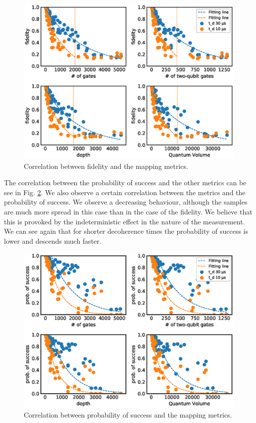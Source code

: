 \begin{figure}[htbp]
\centering
\includegraphics[width=\textwidth]{figures/f_metrics_correlation_poly.eps}
\caption{\label{fig:f_metrics_correlation}
Correlation between fidelity and the mapping metrics.}
\end{figure}

The correlation between the probability of success and the other metrics can be see in Fig. \ref{fig:ps_metrics_correlation}.
We also observe a certain correlation between the metrics and the probability of success.
We observe a decreasing behaviour, although the samples are much more spread in this case than in the case of the fidelity. We believe that this is provoked by the indeterministic effect in the nature of the measurement.
We can see again that for shorter decoherence times the probability of success is lower and descends much faster. 


\begin{figure}[htbp]
\centering
\includegraphics[width=\textwidth]{figures/ps_metrics_correlation.eps}
\caption{\label{fig:ps_metrics_correlation}
Correlation between probability of success and the mapping metrics.}
\end{figure}

